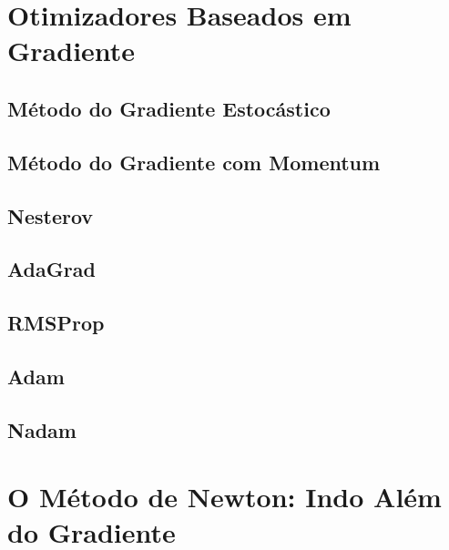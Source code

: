 \section{Otimizadores Baseados em Gradiente}

\subsection{Método do Gradiente Estocástico}

\subsection{Método do Gradiente com Momentum}

\subsection{Nesterov}

\subsection{AdaGrad}

\subsection{RMSProp}

\subsection{Adam}

\subsection{Nadam}


\section{O Método de Newton: Indo Além do Gradiente}

